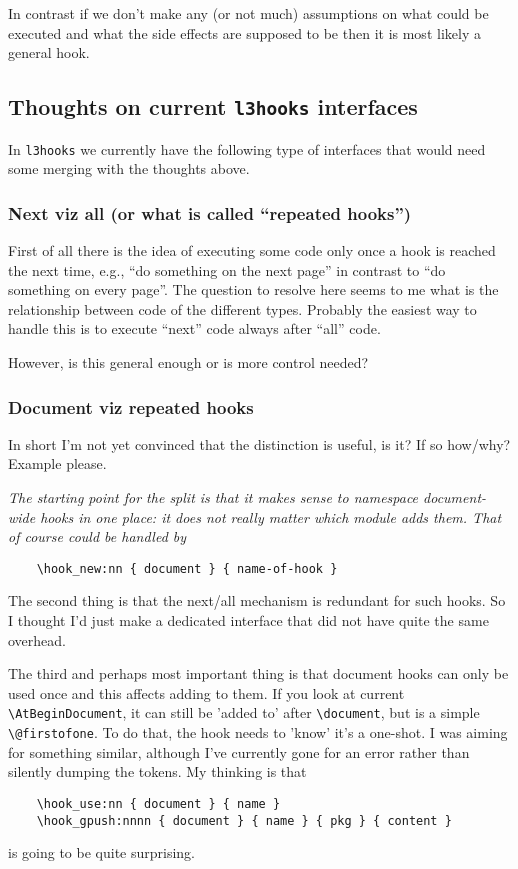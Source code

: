 \documentclass{article}
\newcounter{hook}
\newenvironment{comment}[2][]  %
               {\par[#1 #2]\itshape}
               {\par}
\newcommand\cs[1]{\texttt{\textbackslash #1}}
\begin{document}
In contrast if we don't make any (or not much) assumptions on what
could be executed and what the side effects are supposed to be then it
is most likely a general hook.




\subsection{Thoughts on current \texttt{l3hooks} interfaces}

In \texttt{l3hooks} we currently have the following type of interfaces
that would need some merging with the thoughts above.

\subsubsection{Next viz all (or what is called \enquote{repeated hooks})}

First of all there is the idea of executing some code only once a hook
is reached the next time, e.g., \enquote{do something on the next
  page} in contrast to \enquote{do something on every page}. The
question to resolve here seems to me what is the relationship between
code of the different types. Probably the easiest way to handle this
is to execute \enquote{next} code always after \enquote{all} code.

However, is this general enough or is more control needed?


\subsubsection{Document viz repeated hooks}

In short I'm not yet convinced that the distinction is useful, is it?
If so how/why? Example please.

\begin{comment}[JAW]{2019-07-01}
  The starting point for the split is that it makes sense to namespace
  document-wide hooks in one place: it does not really matter which
  module adds them. That of course could be handled by
\begin{verbatim}
    \hook_new:nn { document } { name-of-hook }
\end{verbatim}

The second thing is that the next/all mechanism is redundant for such
hooks. So I thought I'd just make a dedicated interface that did not
have quite the same overhead.

The third and perhaps most important thing is that document hooks can
only be used once and this affects adding to them. If you look at
current \cs{AtBeginDocument}, it can still be 'added to' after \cs{document},
but is a simple \cs{@firstofone}. To do that, the hook needs to 'know'
it's a one-shot. I was aiming for something similar, although I've
currently gone for an error rather than silently dumping the
tokens. My thinking is that
\begin{verbatim}
    \hook_use:nn { document } { name }
    \hook_gpush:nnnn { document } { name } { pkg } { content }
\end{verbatim}
is going to be quite surprising.
\end{comment}
\end{document}
